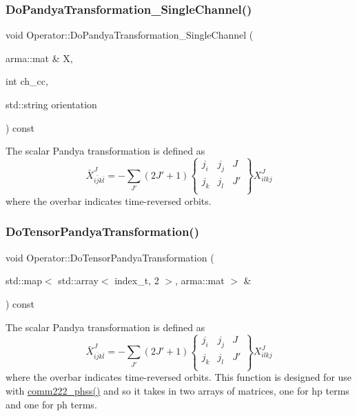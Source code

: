 \subsubsection{\texorpdfstring{Do\+Pandya\+Transformation\+\_\+\+Single\+Channel()}{DoPandyaTransformation\_SingleChannel()}}
{\footnotesize\ttfamily void Operator\+::\+Do\+Pandya\+Transformation\+\_\+\+Single\+Channel (\begin{DoxyParamCaption}\item[{arma\+::mat \&}]{X,  }\item[{int}]{ch\+\_\+cc,  }\item[{std\+::string}]{orientation }\end{DoxyParamCaption}) const}

The scalar Pandya transformation is defined as \[ \bar{X}^{J}_{i\bar{j}k\bar{l}} = - \sum_{J'} (2J'+1) \left\{ \begin{array}{lll} j_i & j_j & J \\ j_k & j_l & J' \\ \end{array} \right\} X^{J}_{ilkj} \] where the overbar indicates time-\/reversed orbits. \mbox{\label{classOperator_a9e538b3f99003fb5ba5912cfe57a8ada}} 
\subsubsection{\texorpdfstring{Do\+Tensor\+Pandya\+Transformation()}{DoTensorPandyaTransformation()}}
{\footnotesize\ttfamily void Operator\+::\+Do\+Tensor\+Pandya\+Transformation (\begin{DoxyParamCaption}\item[{std\+::map$<$ std\+::array$<$ index\+\_\+t, 2 $>$, arma\+::mat $>$ \&}]{ }\end{DoxyParamCaption}) const}

The scalar Pandya transformation is defined as \[ \bar{X}^{J}_{i\bar{j}k\bar{l}} = - \sum_{J'} (2J'+1) \left\{ \begin{array}{lll} j_i & j_j & J \\ j_k & j_l & J' \\ \end{array} \right\} X^{J}_{ilkj} \] where the overbar indicates time-\/reversed orbits. This function is designed for use with \hyperlink{classOperator_a25b768c4ddceead49af1c7f69d5071ea}{comm222\+\_\+phss()} and so it takes in two arrays of matrices, one for hp terms and one for ph terms. \mbox{\label{classOperator_ab26470d0c88d61699443223675e57bbe}} 
